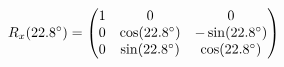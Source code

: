 \documentclass[preview]{standalone}
\begin{document}
\begin{align*}
\special{dvisvgm:raw <g id='unique000'>}R_x(22.8^\circ) = \begin{pmatrix} 1 & 0 & 0 \\ 0 & \cos(22.8^\circ) & -\sin(22.8^\circ) \\ 0 & \sin(22.8^\circ) & \cos(22.8^\circ) \end{pmatrix}\special{dvisvgm:raw </g>}
\end{align*}
\end{document}
